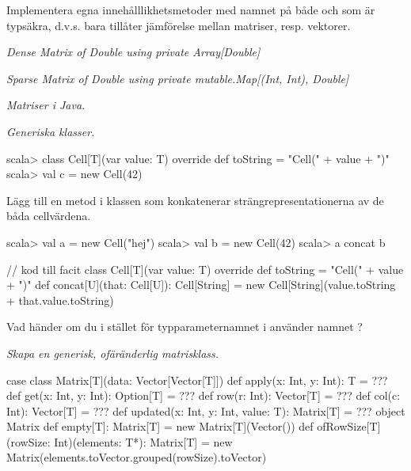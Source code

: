 \Subtask Implementera egna innehålllikhetsmetoder med namnet \code{===} på både  och  som är typsäkra, d.v.s. bara tillåter jämförelse mellan matriser, resp. vektorer.


\Task \emph{Dense Matrix of Double using private Array[Double]}


\Task \emph{Sparse Matrix of Double using private mutable.Map[(Int, Int), Double]}




\Task \emph{Matriser i Java.}





\Task \emph{Generiska klasser.} 

\begin{REPL}
scala> class Cell[T](var value: T){
         override def toString = "Cell(" + value + ")"
       }
scala> val c = new Cell(42)
\end{REPL}

\Subtask Lägg till en metod  i klassen  som konkatenerar strängrepresentationerna av de båda cellvärdena.

\begin{REPL}
scala> val a = new Cell("hej")
scala> val b = new Cell(42)
scala> a concat b
\end{REPL}

\begin{Code}
// kod till facit
class Cell[T](var value: T){
  override def toString = "Cell(" + value + ")"
  def concat[U](that: Cell[U]): Cell[String] = 
    new Cell[String](value.toString + that.value.toString)
}
\end{Code}

\Subtask\Pen Vad händer om du i stället för typparameternamnet  i  använder namnet ?

\Task \emph{Skapa en generisk, ofäränderlig matrisklass.}

\begin{Code}
case class Matrix[T](data: Vector[Vector[T]]) {
  def apply(x: Int, y: Int): T = ???
  def get(x: Int, y: Int): Option[T] = ???
  def row(r: Int): Vector[T] = ???
  def col(c: Int): Vector[T] = ???
  def updated(x: Int, y: Int, value: T): Matrix[T] = ???
}
object Matrix {
  def empty[T]: Matrix[T] = new Matrix[T](Vector())
  def ofRowSize[T](rowSize: Int)(elements: T*): Matrix[T] =
    new Matrix(elements.toVector.grouped(rowSize).toVector)
}
\end{Code}

